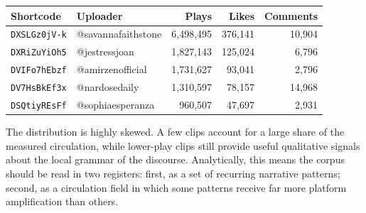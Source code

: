 \documentclass[12pt]{article}
\begin{document}
\begin{longtable}{p{} p{} r r r}
\toprule
\textbf{Shortcode} & \textbf{Uploader} & \textbf{Plays} & \textbf{Likes} & \textbf{Comments} \\
\midrule
\endhead
\texttt{DXSLGz0jV-k} & @savannafaithstone & 6,498,495 & 376,141 & 10,904 \\
\texttt{DXRiZuYiOh5} & @jestressjoan & 1,827,143 & 125,024 & 6,796 \\
\texttt{DVIFo7hEbzf} & @amirzenofficial & 1,731,627 & 93,041 & 2,796 \\
\texttt{DV7HsBkEf3x} & @nardosedaily & 1,310,597 & 78,157 & 14,968 \\
\texttt{DSQtiyREsFf} & @sophiaesperanza & 960,507 & 47,697 & 2,931 \\
\bottomrule
\end{longtable}

The distribution is highly skewed. A few clips account for a large share of the measured circulation, while lower-play clips still provide useful qualitative signals about the local grammar of the discourse. Analytically, this means the corpus should be read in two registers: first, as a set of recurring narrative patterns; second, as a circulation field in which some patterns receive far more platform amplification than others.
\end{document}
